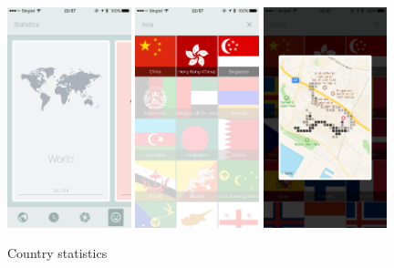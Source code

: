 \documentclass[12pt,a4paper]{article}
\begin{document}
            \begin{figure}
                \includegraphics[width=0.32\textwidth]{4-1-7-a}
                \includegraphics[width=0.32\textwidth]{4-1-7-b}
                \includegraphics[width=0.32\textwidth]{4-1-7-c}
                \centering
                \caption{Country statistics}
                \label{fig:statistics}
            \end{figure}
            
\end{document}
